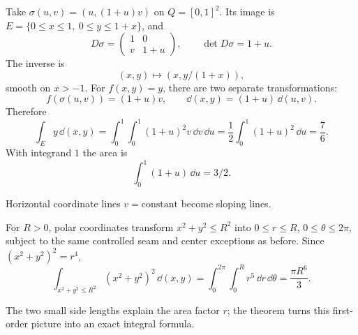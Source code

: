 \begin{example}
Take $\sigma(u,v)=(u,(1+u)v)$ on $Q=[0,1]^2$. Its image is
$E=\{0\leq x\leq1,\ 0\leq y\leq1+x\}$, and
\[
D\sigma=\begin{pmatrix}1&0\\v&1+u\end{pmatrix},\qquad \det D\sigma=1+u.
\]
The inverse is
\[
(x,y)\mapsto(x,y/(1+x)),
\]
 smooth on $x>-1$.
For $f(x,y)=y$, there are two separate transformations:
\[
f(\sigma(u,v))=(1+u)v,\qquad \dd(x,y)=(1+u)\,\dd(u,v).
\]
Therefore
\[
\int_E y\,\dd(x,y)=\int_0^1\int_0^1(1+u)^2v\,\dd v\,\dd u
=\frac12\int_0^1(1+u)^2\,\dd u=\frac76.
\]
With integrand $1$ the area is
\[
\int_0^1(1+u)\,\dd u=3/2.
\]

\begin{center}
\end{center}
Horizontal coordinate lines $v=\text{constant}$ become sloping lines.
\end{example}
\begin{example}
For $R>0$, polar coordinates transform $x^2+y^2\leq R^2$ into
$0\leq r\leq R$, $0\leq\theta\leq2\pi$, subject to the same controlled
seam and center exceptions as before. Since $(x^2+y^2)^2=r^4$,
\[
\int_{x^2+y^2\leq R^2}(x^2+y^2)^2\,\dd(x,y)
=\int_0^{2\pi}\int_0^R r^5\,\dd r\,\dd\theta=\frac{\pi R^6}{3}.
\]
\begin{center}
\end{center}
The two small side lengths explain the area factor $r$; the theorem
turns this first-order picture into an exact integral formula.
\end{example}
